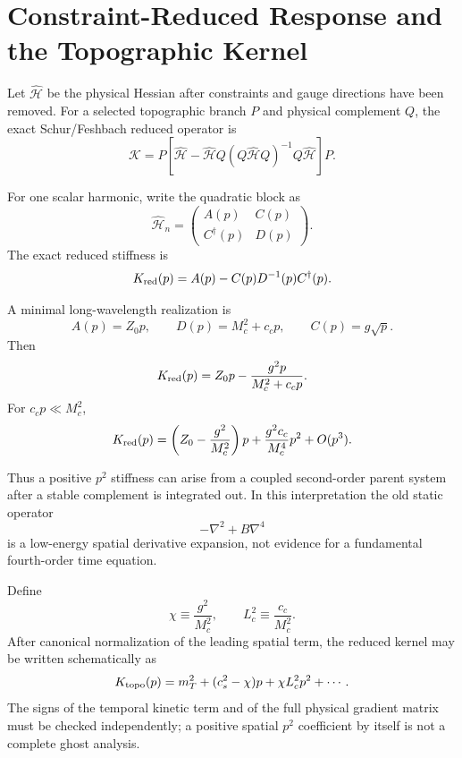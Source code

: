 ﻿\section{Constraint-Reduced Response and the Topographic Kernel}

Let \(\widehat{\mathcal H}\) be the physical Hessian after constraints and gauge directions have been removed. For a selected topographic branch \(P\) and physical complement \(Q\), the exact Schur/Feshbach reduced operator is
\[
\mathcal K
=
P\left[
\widehat{\mathcal H}
-
\widehat{\mathcal H}Q
(Q\widehat{\mathcal H}Q)^{-1}
Q\widehat{\mathcal H}
\right]P.
\]

For one scalar harmonic, write the quadratic block as
\[
\widehat{\mathcal H}_n
=
\begin{pmatrix}
A(p) & C(p)\\
C^\dagger(p) & D(p)
\end{pmatrix}.
\]
The exact reduced stiffness is
\[
K_{\rm red}(p)=A(p)-C(p)D^{-1}(p)C^\dagger(p).
\]

A minimal long-wavelength realization is
\[
A(p)=Z_0p,\qquad
D(p)=M_c^2+c_cp,\qquad
C(p)=g\sqrt p.
\]
Then
\[
K_{\rm red}(p)
=
Z_0p-\frac{g^2p}{M_c^2+c_cp}.
\]
For \(c_cp\ll M_c^2\),
\[
K_{\rm red}(p)
=
\left(Z_0-\frac{g^2}{M_c^2}\right)p
+
\frac{g^2c_c}{M_c^4}p^2
+O(p^3).
\]

Thus a positive \(p^2\) stiffness can arise from a coupled second-order parent system after a stable complement is integrated out. In this interpretation the old static operator
\[
-\nabla^2+B\nabla^4
\]
is a low-energy spatial derivative expansion, not evidence for a fundamental fourth-order time equation.

Define
\[
\chi\equiv\frac{g^2}{M_c^2},
\qquad
L_c^2\equiv\frac{c_c}{M_c^2}.
\]
After canonical normalization of the leading spatial term, the reduced kernel may be written schematically as
\[
K_{\rm topo}(p)
=
m_T^2+
(c_s^2-\chi)p
+
\chi L_c^2p^2+\cdots.
\]
The signs of the temporal kinetic term and of the full physical gradient matrix must be checked independently; a positive spatial \(p^2\) coefficient by itself is not a complete ghost analysis.
